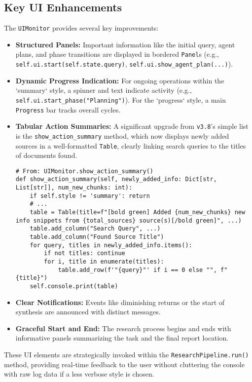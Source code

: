 \documentclass[12pt, a4paper]{article}
\begin{document}
\subsection{Key UI Enhancements}
The \texttt{UIMonitor} provides several key improvements:
\begin{itemize}
    \item \textbf{Structured Panels:} Important information like the initial query, agent plans, and phase transitions are displayed in bordered \texttt{Panel}s (e.g., \verb|self.ui.start(self.state.query)|, \verb|self.ui.show_agent_plan(...)|).
    \item \textbf{Dynamic Progress Indication:} For ongoing operations within the `summary` style, a spinner and text indicate activity (e.g., \verb|self.ui.start_phase("Planning")|). For the `progress` style, a main \texttt{Progress} bar tracks overall cycles.
    \item \textbf{Tabular Action Summaries:} A significant upgrade from \verb|v3.8|'s simple list is the \verb|show_action_summary| method, which now displays newly added sources in a well-formatted \texttt{Table}, clearly linking search queries to the titles of documents found.

    \begin{lstlisting}[style=myPython]
# From: UIMonitor.show_action_summary()
def show_action_summary(self, newly_added_info: Dict[str, List[str]], num_new_chunks: int):
    if self.style != 'summary': return
    # ...
    table = Table(title=f"[bold green] Added {num_new_chunks} new info snippets from {total_sources} source(s)[/bold green]", ...)
    table.add_column("Search Query", ...)
    table.add_column("Found Source Title")
    for query, titles in newly_added_info.items():
        if not titles: continue
        for i, title in enumerate(titles):
            table.add_row(f'"{query}"' if i == 0 else "", f" {title}")
    self.console.print(table)
    \end{lstlisting}
    \item \textbf{Clear Notifications:} Events like diminishing returns or the start of synthesis are announced with distinct messages.
    \item \textbf{Graceful Start and End:} The research process begins and ends with informative panels summarizing the task and the final report location.
\end{itemize}
These UI elements are strategically invoked within the \verb|ResearchPipeline.run()| method, providing real-time feedback to the user without cluttering the console with raw log data if a less verbose style is chosen.
\end{document}
